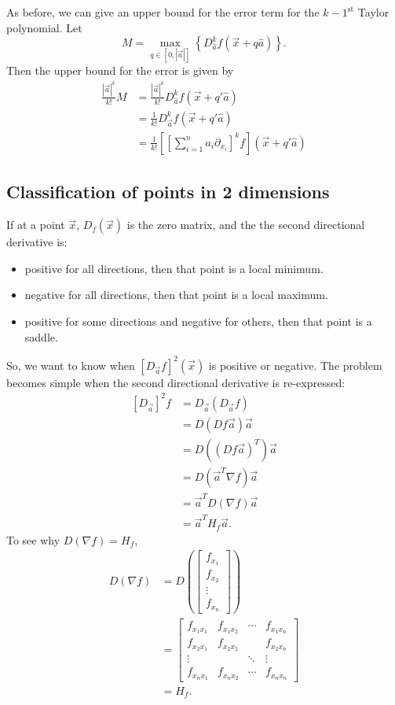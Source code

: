 \documentclass{article}
\newcommand{\lp}[1]{\left(#1\right)}
\theoremstyle{definition}
\begin{document}
As before, we can give an upper bound for the error term for the $k-1^\text{st}$ Taylor polynomial. Let \[M=\max_{q\in[0,|\vec a|]}\left\{D_{\hat a}^kf(\vec x+q\hat a)\right\}.\] Then the upper bound for the error is given by
\begin{align*}
	\frac{|\vec a|^k}{k!}M&=\frac{|\vec a|^k}{k!}D_{\hat a}^kf(\vec x+q'\hat a)\\
	&=\frac{1}{k!}D_{\vec a}^kf(\vec x+q'\hat a)\\
	&=\frac{1}{k!}\left[\left[\sum_{i=1}^na_i\partial_{x_i}\right]^kf\right](\vec x+q'\hat a)
\end{align*}









\newpage
\subsection{Classification of points in 2 dimensions}
If at a point $\vec x$, $D_f(\vec x)$ is the zero matrix, and the the second directional derivative is:
\begin{itemize}
	\item positive for all directions, then that point is a local minimum.
	\item negative for all directions, then that point is a local maximum.
	\item positive for some directions and negative for others, then that point is a saddle.
\end{itemize}
So, we want to know when $\left[D_{\vec a}f\right]^2(\vec x)$ is positive or negative. The problem becomes simple when the second directional derivative is re-expressed:
\begin{align*}
	\left[D_{\vec a}\right]^2f&=D_{\vec a}(D_{\vec a}f)\\
	&=D(Df\vec a)\vec a\\
	&=D((Df\vec a)^T)\vec a\tag*{(because $Df\vec a$ is 1-by-1)}\\
	&=D(\vec a^T\nabla f)\vec a\\
	&=\vec a^TD(\nabla f)\vec a\\
	&=\vec a^TH_f\vec a.
\end{align*}
To see why $D(\nabla f)=H_f$,
\begin{align*}
	D(\nabla f)&=D\lp{\begin{bmatrix}f_{x_1}\\f_{x_2}\\\vdots\\f_{x_n}\end{bmatrix}}\\
	&=\begin{bmatrix}f_{x_1x_1}&f_{x_1x_2}&\cdots&f_{x_1x_n}\\f_{x_2x_1}&f_{x_2x_2}&&f_{x_2x_n}\\\vdots&&\ddots&\vdots\\f_{x_nx_1}&f_{x_nx_2}&\cdots&f_{x_nx_n}\end{bmatrix}\\
	&=H_f.
\end{align*}
\end{document}
